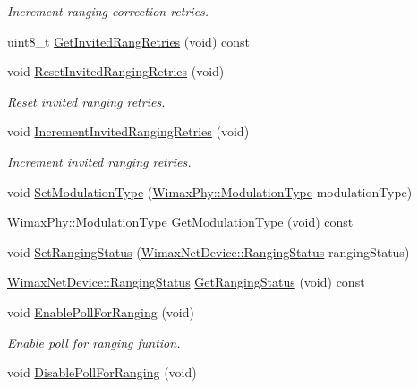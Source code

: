 \begin{DoxyCompactItemize}
\begin{DoxyCompactList}\small\item\em Increment ranging correction retries. \end{DoxyCompactList}\item 
uint8\+\_\+t \hyperlink{classns3_1_1SSRecord_a4a3093b826282ebb5eef0af927019b71}{Get\+Invited\+Rang\+Retries} (void) const 
\item 
void \hyperlink{classns3_1_1SSRecord_aec33d8100f52d668ac5e73949f1c7160}{Reset\+Invited\+Ranging\+Retries} (void)
\begin{DoxyCompactList}\small\item\em Reset invited ranging retries. \end{DoxyCompactList}\item 
void \hyperlink{classns3_1_1SSRecord_aaaa1931f5cc66c626a8bdb14affa3010}{Increment\+Invited\+Ranging\+Retries} (void)
\begin{DoxyCompactList}\small\item\em Increment invited ranging retries. \end{DoxyCompactList}\item 
void \hyperlink{classns3_1_1SSRecord_a015c0f21018ef11a4efb3b63c0c32fb5}{Set\+Modulation\+Type} (\hyperlink{classns3_1_1WimaxPhy_a044c5d8a48ca992c39c2a946f6e755fa}{Wimax\+Phy\+::\+Modulation\+Type} modulation\+Type)
\item 
\hyperlink{classns3_1_1WimaxPhy_a044c5d8a48ca992c39c2a946f6e755fa}{Wimax\+Phy\+::\+Modulation\+Type} \hyperlink{classns3_1_1SSRecord_afa9853bb12ad4cef26d11c0336c98df0}{Get\+Modulation\+Type} (void) const 
\item 
void \hyperlink{classns3_1_1SSRecord_a114dce3a7a4aff49f153deb95058ff9a}{Set\+Ranging\+Status} (\hyperlink{classns3_1_1WimaxNetDevice_a2a74c0f01e51abc1851a630242e7b591}{Wimax\+Net\+Device\+::\+Ranging\+Status} ranging\+Status)
\item 
\hyperlink{classns3_1_1WimaxNetDevice_a2a74c0f01e51abc1851a630242e7b591}{Wimax\+Net\+Device\+::\+Ranging\+Status} \hyperlink{classns3_1_1SSRecord_aab40d370e0d6c95cb9f5eb64e4d3c80b}{Get\+Ranging\+Status} (void) const 
\item 
void \hyperlink{classns3_1_1SSRecord_a2bdef6783ecfc64b6be34fa1103bc3b0}{Enable\+Poll\+For\+Ranging} (void)
\begin{DoxyCompactList}\small\item\em Enable poll for ranging funtion. \end{DoxyCompactList}\item 
void \hyperlink{classns3_1_1SSRecord_a6a5bbdb2d3fdaaefd664a17e94ccd786}{Disable\+Poll\+For\+Ranging} (void)

\end{DoxyCompactItemize}
